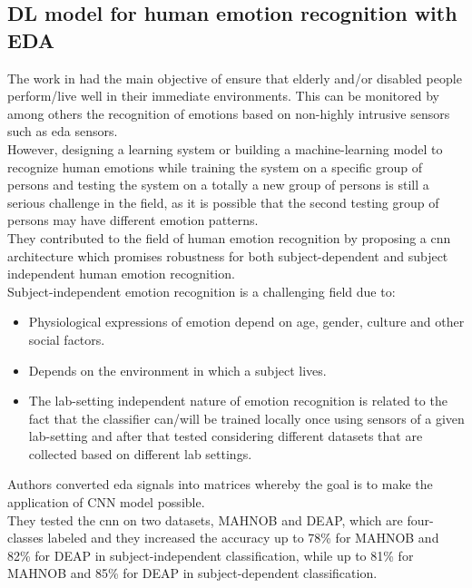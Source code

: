 \subsection{DL model for human emotion recognition with EDA}
The work in \cite{al2019deep} had the main objective of ensure that elderly and/or disabled people perform/live well in their immediate environments. This can be monitored by among others the recognition of emotions based on non-highly intrusive sensors such as \gls{eda} sensors.
\\
However, designing a learning system or building a machine-learning model to recognize human emotions while training the system on a specific group of persons and testing the system on a totally a new group of persons is still a serious challenge in the field, as it is possible that the second testing group of persons may have different emotion patterns.
\\ \indent
They contributed to the field of human emotion recognition by proposing a \gls{cnn} architecture which promises robustness for both subject-dependent and subject independent human emotion recognition.
\\
Subject-independent emotion recognition is a challenging field due to:
\begin{itemize}
	\item Physiological expressions of emotion depend on age, gender, culture and other social factors.
	\item Depends on the environment in which a subject lives.
	\item The lab-setting independent nature of emotion recognition is related to the fact that the classifier can/will be trained locally once using sensors of a given lab-setting and after that tested considering different datasets that are collected based on different lab settings. 
\end{itemize}
Authors converted \gls{eda} signals into matrices whereby the goal is to make the application of CNN model possible.
\\
They tested the \gls{cnn} on two datasets, MAHNOB and DEAP, which are four-classes labeled and they increased the accuracy up to 78\% for MAHNOB and 82\% for DEAP in subject-independent classification, while up to 81\% for MAHNOB and 85\% for DEAP in subject-dependent classification.

